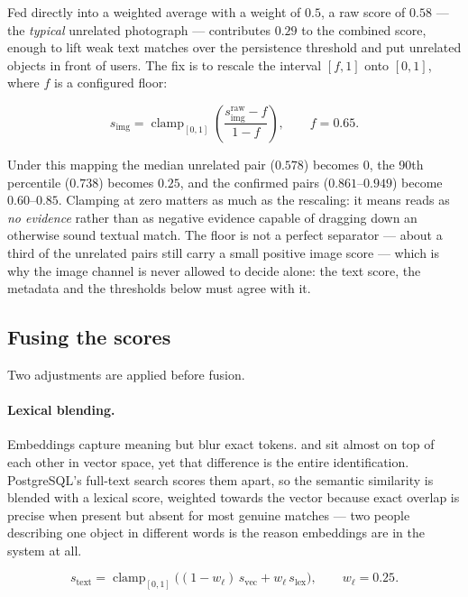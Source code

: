 Fed directly into a weighted average with a weight of $0.5$, a raw score of
$0.58$ --- the \emph{typical} unrelated photograph --- contributes $0.29$ to the
combined score, enough to lift weak text matches over the persistence threshold
and put unrelated objects in front of users. The fix is to rescale the interval
$[f, 1]$ onto $[0, 1]$, where $f$ is a configured floor:

\begin{equation}
s_{\text{img}} = \operatorname{clamp}_{[0,1]}\!\left(\frac{s^{\text{raw}}_{\text{img}} - f}{1 - f}\right),
\qquad f = 0.65 .
\label{eq:calibrate}
\end{equation}

Under this mapping the median unrelated pair ($0.578$) becomes $0$, the 90th
percentile ($0.738$) becomes $0.25$, and the confirmed pairs ($0.861$--$0.949$)
become $0.60$--$0.85$. Clamping at zero matters as much as the rescaling: it
means  reads as \emph{no
evidence} rather than as negative evidence capable of dragging down an otherwise
sound textual match. The floor is not a perfect separator --- about a third of
the unrelated pairs still carry a small positive image score --- which is why
the image channel is never allowed to decide alone: the text score, the metadata
and the thresholds below must agree with it.

\subsection{Fusing the scores}

Two adjustments are applied before fusion.

\paragraph{Lexical blending.} Embeddings capture meaning but blur exact tokens.
 and  sit almost on top of each other in
vector space, yet that difference is the entire identification. PostgreSQL's
full-text search scores them apart, so the semantic similarity is blended with a
lexical score, weighted towards the vector because exact overlap is precise when
present but absent for most genuine matches --- two people describing one object
in different words is the reason embeddings are in the system at all.

\begin{equation}
s_{\text{text}} = \operatorname{clamp}_{[0,1]}\!\big((1 - w_{\ell})\, s_{\text{vec}} + w_{\ell}\, s_{\text{lex}}\big),
\qquad w_{\ell} = 0.25 .
\label{eq:lexical}
\end{equation}


